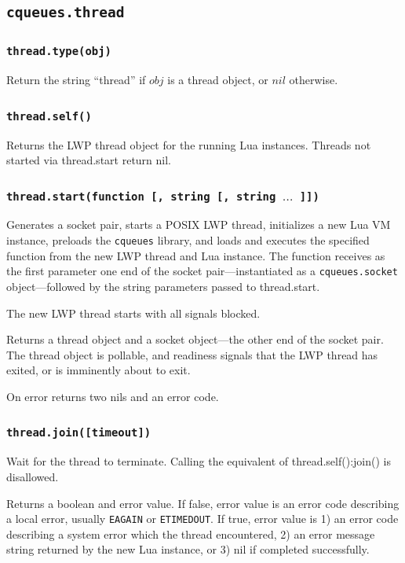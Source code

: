\documentclass[11pt, oneside]{memoir}
\newcommand*{\cqueues}[0]{\texttt{cqueues}\xspace}
\newcommand*{\routine}[1]{\texttt{#1}\xspace}
\newcommand*{\fn}[1]{\texttt{#1}\xspace}
\newcommand*{\module}[1]{\texttt{#1}\xspace}
\newcommand*{\errno}[1]{\texttt{#1}\xspace}
\newcounter{toccols}
\newenvironment{Module}[1]{
	\subsection{\texttt{#1}}
	\addtocontents{toc}{
		\protect\begin{multicols}{\value{toccols}}
	}
}{
	\addtocontents{toc}{\protect\end{multicols}}
}
\begin{document}
\begin{Module}{cqueues.thread}

\subsubsection[\routine{thread.type}]{\routine{thread.type(obj)}}
Return the string ``thread'' if $obj$ is a thread object, or $nil$ otherwise.

\subsubsection[\fn{thread.self}]{\fn{thread.self()}}
Returns the LWP thread object for the running Lua instances. Threads not started via thread.start return nil.

\subsubsection[\fn{thread.start}]{\fn{thread.start(function [, string [, string $\ldots$ ]])}}
Generates a socket pair, starts a POSIX LWP thread, initializes a new Lua VM instance, preloads the \cqueues library, and loads and executes the specified function from the new LWP thread and Lua instance. The function receives as the first parameter one end of the socket pair---instantiated as a \module{cqueues.socket} object---followed by the string parameters passed to thread.start.

The new LWP thread starts with all signals blocked.

Returns a thread object and a socket object---the other end of the socket pair. The thread object is pollable, and readiness signals that the LWP thread has exited, or is imminently about to exit.

On error returns two nils and an error code.

\subsubsection[\fn{thread:join}]{\fn{thread.join([timeout])}}
Wait for the thread to terminate. Calling the equivalent of thread.self():join() is disallowed.

Returns a boolean and error value. If false, error value is an error code describing a local error, usually \errno{EAGAIN} or \errno{ETIMEDOUT}. If true, error value is 1) an error code describing a system error which the thread encountered, 2) an error message string returned by the new Lua instance, or 3) nil if completed successfully.

\end{Module}
\end{document}
